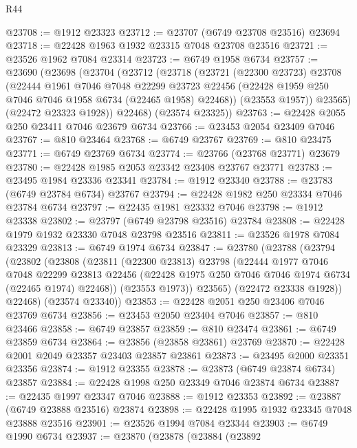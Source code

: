 \begin{lexlean}{R44}
\begin{coremodule}
{@23708 := @1912 @23323
@23712 := @23707 (@6749 @23708 @23516) @23694
@23718 := @22428 @1963 @1932 @23315 @7048 @23708 @23516
@23721 := @23526 @1962 @7084 @23314
@23723 := @6749 @1958 @6734
@23757 := @23690
    (@23698
      (@23704
        (@23712
          (@23718
            (@23721
              (@22300 @23723)
              @23708
              (@22444
                @1961
                @7046
                @7048
                @22299
                @23723
                @22456
                (@22428 @1959 @250 @7046 @7046 @1958 @6734 (@22465 @1958) @22468))
              (@23553 @1957))
            @23565)
          (@22472 @23323 @1928))
        @22468)
      (@23574 @23325))
@23763 := @22428 @2055 @250 @23411 @7046 @23679 @6734
@23766 := @23453 @2054 @23409 @7046
@23767 := @810 @23464
@23768 := @6749 @23767
@23769 := @810 @23475
@23771 := @6749 @23769 @6734
@23774 := @23766 (@23768 @23771) @23679
@23780 := @22428 @1985 @2053 @23342 @23408 @23767 @23771
@23783 := @23495 @1984 @23336 @23341
@23784 := @1912 @23340
@23788 := @23783 (@6749 @23784 @6734) @23767
@23794 := @22428 @1982 @250 @23334 @7046 @23784 @6734
@23797 := @22435 @1981 @23332 @7046
@23798 := @1912 @23338
@23802 := @23797 (@6749 @23798 @23516) @23784
@23808 := @22428 @1979 @1932 @23330 @7048 @23798 @23516
@23811 := @23526 @1978 @7084 @23329
@23813 := @6749 @1974 @6734
@23847 := @23780
    (@23788
      (@23794
        (@23802
          (@23808
            (@23811
              (@22300 @23813)
              @23798
              (@22444
                @1977
                @7046
                @7048
                @22299
                @23813
                @22456
                (@22428 @1975 @250 @7046 @7046 @1974 @6734 (@22465 @1974) @22468))
              (@23553 @1973))
            @23565)
          (@22472 @23338 @1928))
        @22468)
      (@23574 @23340))
@23853 := @22428 @2051 @250 @23406 @7046 @23769 @6734
@23856 := @23453 @2050 @23404 @7046
@23857 := @810 @23466
@23858 := @6749 @23857
@23859 := @810 @23474
@23861 := @6749 @23859 @6734
@23864 := @23856 (@23858 @23861) @23769
@23870 := @22428 @2001 @2049 @23357 @23403 @23857 @23861
@23873 := @23495 @2000 @23351 @23356
@23874 := @1912 @23355
@23878 := @23873 (@6749 @23874 @6734) @23857
@23884 := @22428 @1998 @250 @23349 @7046 @23874 @6734
@23887 := @22435 @1997 @23347 @7046
@23888 := @1912 @23353
@23892 := @23887 (@6749 @23888 @23516) @23874
@23898 := @22428 @1995 @1932 @23345 @7048 @23888 @23516
@23901 := @23526 @1994 @7084 @23344
@23903 := @6749 @1990 @6734
@23937 := @23870
    (@23878
      (@23884
        (@23892
}
\end{coremodule}
\end{lexlean}
